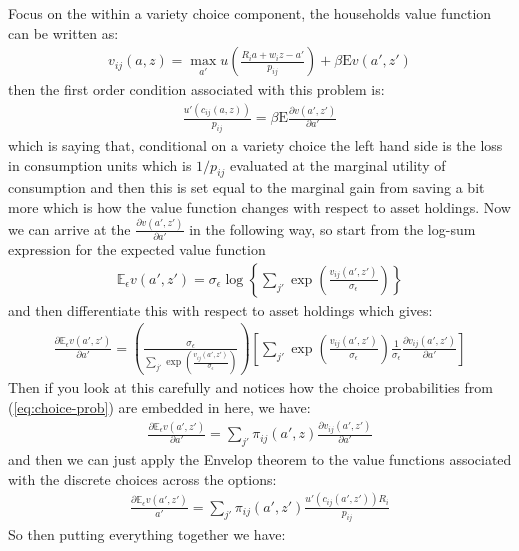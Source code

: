 \documentclass[12pt,pdftex]{article}
\begin{document}
\begin{onehalfspacing}
Focus on the within a variety choice component, the households value function can be written as:
\begin{align}
v_{ij}(a, z) = \max_{a'} u \left( \frac{R_i a + w_i z - a'}{p_{ij}} \right) + \beta  \mathrm{E} v(a', z')
\end{align}
then the first order condition associated with this problem is:
\begin{align}
\frac{u'(c_{ij}(a, z))}{p_{ij}} = \beta \mathrm{E} \frac{\partial v(a', z')}{\partial a'}
\end{align}
which is saying that, conditional on a variety choice the left hand side is the loss in consumption units which is $1 / p_{ij}$ evaluated at the marginal utility of consumption and then this is set equal to the marginal gain from saving a bit more which is how the value function changes with respect to asset holdings. Now we can arrive at the $\frac{\partial v(a', z')}{\partial a'}$ in the following way, so start from the log-sum expression for the expected value function
\begin{align}
\mathbb{E}_{\epsilon} v(a', z') =  \sigma_{\epsilon} \log \left\{ \sum_{j'} \exp \left( \frac{  v_{ij}(a', z')}{\sigma_{\epsilon}} \right) \right\}
\end{align}
and then differentiate this with respect to asset holdings which gives:
\begin{align}
\frac{\partial \mathbb{E}_{\epsilon} v(a', z')}{\partial a'} = \left( \frac{\sigma_{\epsilon}}{\sum_{j'} \exp \left( \frac{  v_{ij}(a', z')}{\sigma_{\epsilon}}\right)} \right)
\left[ \sum_{j'} \exp \left( \frac{  v_{ij}(a', z')}{\sigma_{\epsilon}}\right) \frac{1}{\sigma_{\epsilon}} \frac{\partial v_{ij}(a', z')}{\partial a'}  \right]
\end{align}
Then if you look at this carefully and notices how the choice probabilities from (\ref{eq:choice-prob}) are embedded in here, we have:
\begin{align}
\frac{\partial \mathbb{E}_{\epsilon} v(a', z')}{\partial a'} = \sum_{j'} \pi_{ij}(a', z) \frac{\partial v_{ij}(a', z')}{\partial a'}
\end{align}
and then we can just apply the Envelop theorem to the value functions associated with the discrete choices across the options:
\begin{align}
\frac{\partial \mathbb{E}_{\epsilon} v(a', z')}{a'} = \sum_{j'} \pi_{ij}(a', z') \frac{u'(c_{ij}(a', z'))R_{i}}{p_{ij}}
\end{align}
So then putting everything together we have:
\begin{align}

\end{align}
\end{onehalfspacing}
\end{document}
